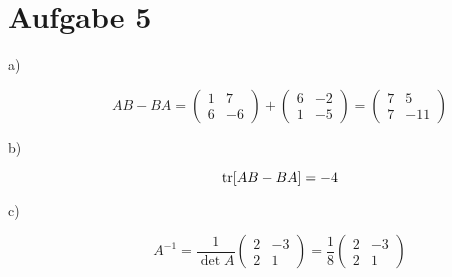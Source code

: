 \section*{Aufgabe 5}
\begin{description}
	\item[a)]
	\[
		AB - BA
		= \begin{pmatrix}
			1 & 7 \\ 6 & -6
		\end{pmatrix} + 
		\begin{pmatrix}
			6 & -2 \\ 1 & -5
		\end{pmatrix}
		= \begin{pmatrix}
			7 & 5 \\ 7 & -11
		\end{pmatrix}
	\] 
	
	\item[b)]
	\[
		\operatorname{tr}[AB - BA] = -4
	\]
	
	\item[c)]
	\[
		A^{-1} = \frac{1}{\det A} \begin{pmatrix}
			2 & -3 \\
			2 & 1
		\end{pmatrix}
		= \frac{1}{8} \begin{pmatrix}
			2 & -3 \\ 2 & 1
		\end{pmatrix}
	\]
\end{description}